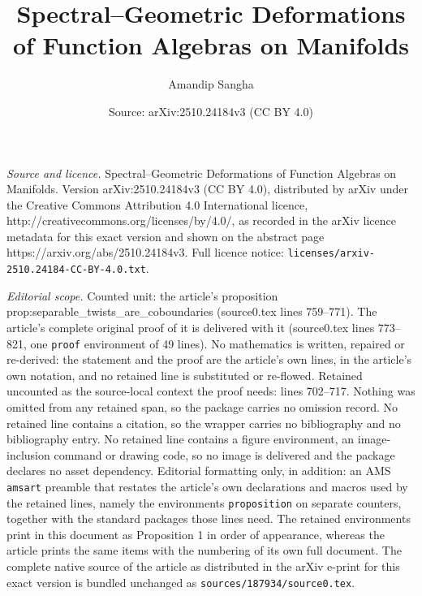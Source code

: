 \documentclass[10pt,a4paper]{amsart}
\title{Spectral--Geometric Deformations of Function Algebras on Manifolds}
\author{Amandip Sangha}
\date{Source: arXiv:2510.24184v3 (CC BY 4.0)}
\begin{document}
\maketitle

\noindent\emph{Source and licence.} Spectral--Geometric Deformations of Function Algebras on Manifolds. Version arXiv:2510.24184v3 (CC BY 4.0), distributed by arXiv under the Creative Commons Attribution 4.0 International licence, http://creativecommons.org/licenses/by/4.0/, as recorded in the arXiv licence metadata for this exact version and shown on the abstract page https://arxiv.org/abs/2510.24184v3. Full licence notice: \texttt{licenses/arxiv-2510.24184-CC-BY-4.0.txt}.\par\smallskip

\noindent\textit{Editorial scope.} Counted unit: the article's proposition prop:separable\_twists\_are\_coboundaries (source0.tex lines 759--771). The article's complete original proof of it is delivered with it (source0.tex lines 773--821, one \texttt{proof} environment of 49 lines). No mathematics is written, repaired or re-derived: the statement and the proof are the article's own lines, in the article's own notation, and no retained line is substituted or re-flowed.  Retained uncounted as the source-local context the proof needs: lines 702--717.  Nothing was omitted from any retained span, so the package carries no omission record.  No retained line contains a citation, so the wrapper carries no bibliography and no bibliography entry.  No retained line contains a figure environment, an image-inclusion command or drawing code, so no image is delivered and the package declares no asset dependency.  Editorial formatting only, in addition: an AMS \texttt{amsart} preamble that restates the article's own declarations and macros used by the retained lines, namely the environments \texttt{proposition} on separate counters, together with the standard packages those lines need.  The retained environments print in this document as Proposition 1 in order of appearance, whereas the article prints the same items with the numbering of its own full document.  The complete native source of the article as distributed in the arXiv e-print for this exact version is bundled unchanged as \texttt{sources/187934/source0.tex}.
\end{document}
